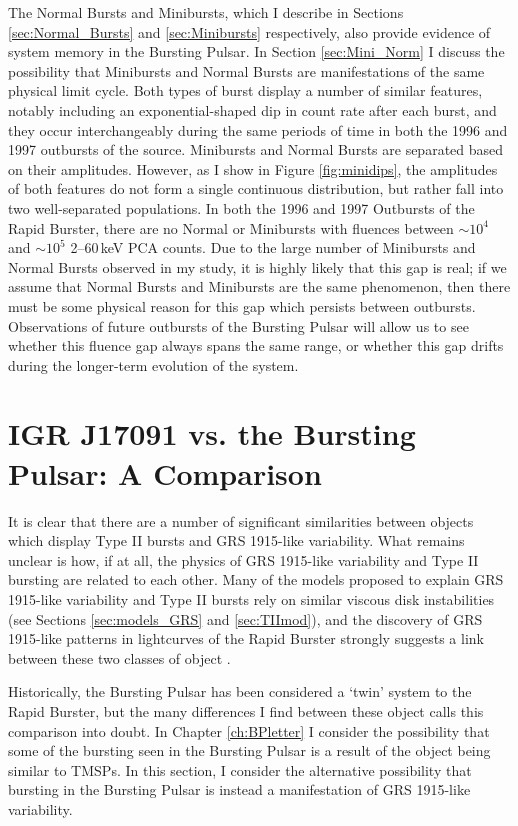 \par The Normal Bursts and Minibursts, which I describe in Sections \ref{sec:Normal_Bursts} and \ref{sec:Minibursts} respectively, also provide evidence of system memory in the Bursting Pulsar.  In Section \ref{sec:Mini_Norm} I discuss the possibility that Minibursts and Normal Bursts are manifestations of the same physical limit cycle.  Both types of burst display a number of similar features, notably including an exponential-shaped dip in count rate after each burst, and they occur interchangeably during the same periods of time in both the 1996 and 1997 outbursts of the source.  Minibursts and Normal Bursts are separated based on their amplitudes.  However, as I show in Figure \ref{fig:minidips}, the amplitudes of both features do not form a single continuous distribution, but rather fall into two well-separated populations.  In both the 1996 and 1997 Outbursts of the Rapid Burster, there are no Normal or Minibursts with fluences between $\sim10^4$ and $\sim10^5$ 2--60\,keV PCA counts.  Due to the large number of Minibursts and Normal Bursts observed in my study, it is highly likely that this gap is real; if we assume that Normal Bursts and Minibursts are the same phenomenon, then there must be some physical reason for this gap which persists between outbursts.  Observations of future outbursts of the Bursting Pulsar will allow us to see whether this fluence gap always spans the same range, or whether this gap drifts during the longer-term evolution of the system.

\section{IGR J17091 vs. the Bursting Pulsar: A Comparison}

\par It is clear that there are a number of significant similarities between objects which display Type II bursts and GRS 1915-like variability.  What remains unclear is how, if at all, the physics of GRS 1915-like variability and Type II bursting are related to each other.  Many of the models proposed to explain GRS 1915-like variability and Type II bursts rely on similar viscous disk instabilities (see Sections \ref{sec:models_GRS} and \ref{sec:TIImod}), and the discovery of GRS 1915-like patterns in lightcurves of the Rapid Burster strongly suggests a link between these two classes of object \citep{Bagnoli_RB}.
\par Historically, the Bursting Pulsar has been considered a `twin' system to the Rapid Burster, but the many differences I find between these object calls this comparison into doubt.  In Chapter \ref{ch:BPletter} I consider the possibility that some of the bursting seen in the Bursting Pulsar is a result of the object being similar to TMSPs.  In this section, I consider the alternative possibility that bursting in the Bursting Pulsar is instead a manifestation of GRS 1915-like variability.

